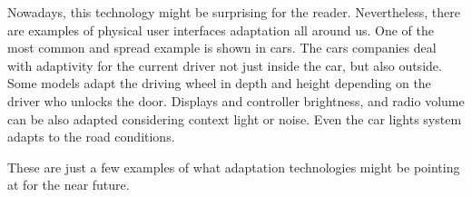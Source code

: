 Nowadays, this technology might be surprising for the reader. Nevertheless, there
are examples of physical user interfaces adaptation all around us. One of the most
common and spread example is shown in cars. The cars companies deal with adaptivity
for the current driver not just inside the car, but also outside. Some models
adapt the driving wheel in depth and height depending on the driver who unlocks
the door. Displays and controller brightness, and radio volume can be also
adapted considering context light or noise. Even the car lights system adapts
to the road conditions.

These are just a few examples of what adaptation technologies might be pointing 
at for the near future.


